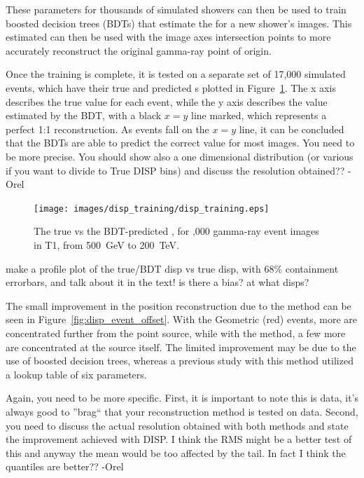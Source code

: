     These parameters for thousands of simulated showers can then be used to train boosted decision trees (BDTs) that estimate the \disp{} for a new shower's images.
    This estimated \disp{} can then be used with the image axes intersection points to more accurately reconstruct the original gamma-ray point of origin.
    
    Once the training is complete, it is tested on a separate set of 17,000 simulated events, which have their true and predicted \disp{}s plotted in Figure~\ref{fig:disptraining}.
    The x axis describes the true \disp{} value for each event, while the y axis describes the \disp{} value estimated by the BDT, with a black $x=y$ line marked, which represents a perfect 1:1 \disp{} reconstruction.
    As events fall on the $x=y$ line, it can be concluded that the BDTs are able to predict the correct \disp{} value for most images.
    {\color{red} You need to be more precise.  You should show also a one dimensional distribution (or various if you want to divide to True DISP bins) and discuss the resolution obtained?? -Orel}

    \begin{figure}[ht]
      \centering
      \texttt{[image: images/disp\_training/disp\_training.eps]}
      \caption[Disp BDT Training]{
        The true \disp{} vs the BDT-predicted \disp{}, for ,000 gamma-ray event images in T1, from \SI{500}{\GeV} to \SI{200}{\TeV}.
      }
      \label{fig:disptraining}
    \end{figure}
    
    {\color{red} make a profile plot of the true/BDT disp vs true disp, with 68\% containment errorbars, and talk about it in the text! is there a bias? at what disps? }

    The small improvement in the position reconstruction due to the \disp{} method can be seen in Figure~\ref{fig:disp_event_offset}.
    With the Geometric (red) events, more are concentrated further from the point source, while with the \disp{} method, a few more are concentrated at the source itself.
    The limited improvement may be due to the use of boosted decision trees, whereas a previous study with this method utilized a lookup table of six parameters\cite{Beilicke2012NIM}.
    
    {\color{red}Again, you need to be more specific. First, it is important to note this is data, it's always good to ''brag`` that your reconstruction method is tested on data.  Second, you need to discuss the actual resolution obtained with both methods and state the improvement achieved with DISP. I think the RMS might be a better test of this and anyway the mean would be too affected by the tail. In fact I think the quantiles are better?? -Orel}
    
